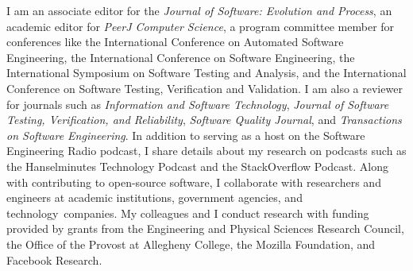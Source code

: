 \documentclass[11pt,letterpaper,sans]{moderncv}
\begin{document}
\vspace*{.1in}


{\small
  I am an associate editor for the {\em Journal of Software: Evolution and Process},
  an academic editor for {\em PeerJ Computer Science}, a program
  committee member for conferences like the International Conference on
  Automated Software Engineering, the International Conference on Software
  Engineering, the International Symposium on Software Testing and Analysis, and
  the International Conference on Software Testing, Verification and Validation.
  I am also a reviewer for journals such as {\em Information and Software
  Technology}, {\em Journal of Software Testing, Verification, and Reliability},
  {\em Software Quality Journal}, and {\em Transactions on Software
  Engineering}. In addition to serving as a host on the Software Engineering
  Radio podcast, I share details about my research on podcasts such as the
  Hanselminutes Technology Podcast and the StackOverflow Podcast. Along with
  contributing to open-source software, I collaborate with researchers and
  engineers at academic institutions, government agencies, and
  \mbox{technology companies}. My colleagues and I conduct research with funding
  provided by grants from the Engineering and Physical Sciences Research
  Council, the Office of the Provost at Allegheny College, the Mozilla
  Foundation, and Facebook Research.
}

%


%
\nocite{*}

%
\setlength\bibitemsep{-.15in}

%
\renewcommand*{\bibfont}{\small}

%

%
\printbibliography[filter=papers,title={Research Publications}]
\end{document}
